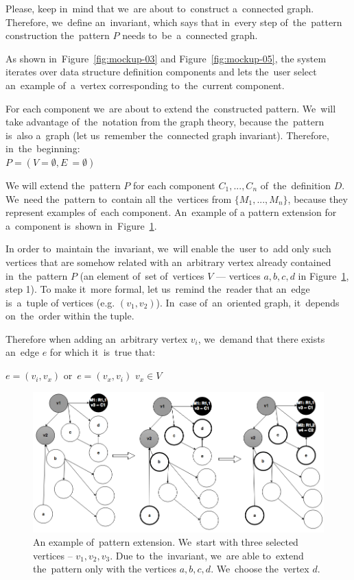 Please, keep in~mind that we~are about to~construct a~connected graph. Therefore, we~define an~invariant, which says that in~every 
step of~the~pattern construction the~pattern $P$ needs to~be~a~connected graph.

As shown in~Figure~\ref{fig:mockup-03} and Figure~\ref{fig:mockup-05},
the system iterates over data 
structure definition components and lets the~user select an~example of~a~vertex corresponding to~the~current component.

For each component we~are about 
to extend the~constructed pattern. We~will take advantage of~the~notation from the
graph theory, because the~pattern is~also a~graph (let us~remember the~connected graph invariant).
Therefore, in~the~beginning:\\

{\centering $P = (V = \emptyset, E~= \emptyset)$ \\[0.5cm]}

We will extend the~pattern $P$ for each component $C_1, ..., C_n$ of~the~definition $D$. We~need the~pattern to~contain all the~vertices from $\{M_1 ,..., 
M_n\}$, because they represent examples of~each component. An~example of
a pattern extension for a~component is~shown in~Figure~\ref{fig:pattern-enhancement}.

In order to~maintain the~invariant, we~will enable the~user to~add only such 
vertices that are somehow related with an~arbitrary vertex already contained in~the~pattern $P$ (an element of~set of~vertices $V$ --- vertices $a,b,c,d$
in Figure~\ref{fig:pattern-enhancement}, step 1).
To make it~more formal, let us~remind the~reader that an~edge is~a~tuple 
of vertices (e.g. $(v_1,v_2)$). In~case of~an~oriented graph, it~depends on~the~order within 
the tuple.

Therefore when adding an~arbitrary vertex $v_i$, we~demand that there exists an~edge $e$ for which it~is~true that:

\begin{center}
{$e = (v_i,v_x)$ or~$e = (v_x, v_i)$ \land $v_x \in V$ \\[0.5cm]}
\end{center}

\begin{figure}
	\centering
	\includegraphics[width=140mm]{img/pattern-enhancement.png}
	\caption{An example of~pattern extension. We~start with three selected vertices
	-- $v_1, v_2, v_3$. Due to~the~invariant, we~are able to~extend the~pattern only with
	the vertices $a,b,c,d$. We~choose the~vertex $d$.}
	\label{fig:pattern-enhancement}
\end{figure}

